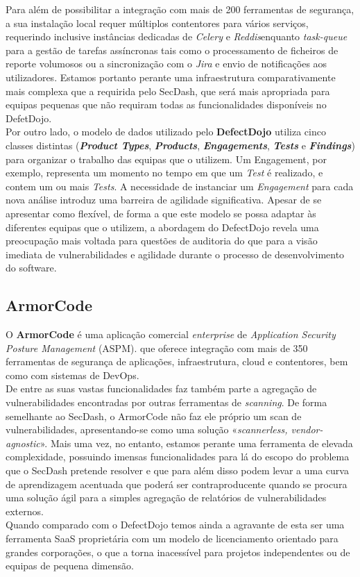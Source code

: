 Para além de possibilitar a integração com mais de 200 ferramentas de segurança, a sua instalação local requer múltiplos contentores para vários serviços, requerindo inclusive instâncias dedicadas de \textit{Celery} e \textit{Reddis}enquanto \textit{task-queue} para a gestão de tarefas assíncronas tais como o processamento de ficheiros de reporte volumosos ou a sincronização com o \textit{Jira} e envio de notificações aos utilizadores. Estamos portanto perante uma infraestrutura comparativamente mais complexa que a requirida pelo SecDash, que será mais apropriada para equipas pequenas que não requiram todas as funcionalidades disponíveis no DefetDojo.\\

Por outro lado, o modelo de dados utilizado pelo \textbf{DefectDojo} utiliza cinco classes distintas (\textbf{\textit{Product Types}}, \textbf{\textit{Products}}, \textbf{\textit{Engagements}}, \textbf{\textit{Tests}} e \textbf{\textit{Findings}}) para organizar o trabalho das equipas que o utilizem.\cite{modeldefectdojo} Um Engagement, por exemplo, representa um momento no tempo em que um \textit{Test} é realizado, e contem um ou mais \textit{Tests}. A necessidade de instanciar um \textit{Engagement} para cada nova análise introduz uma barreira de agilidade significativa. Apesar de se apresentar como flexível, de forma a que este modelo se possa adaptar às diferentes equipas que o utilizem, a abordagem do DefectDojo revela uma preocupação mais voltada para questões de auditoria do que para a visão imediata de vulnerabilidades e agilidade durante o processo de desenvolvimento do software.\\

\subsection{ArmorCode}
O \textbf{ArmorCode} é uma aplicação comercial \textit{enterprise} de \textit{Application Security Posture Management} (ASPM). que oferece integração com mais de 350 ferramentas de segurança de aplicações, infraestrutura, cloud e contentores, bem como com sistemas de DevOps. \\

De entre as suas vastas funcionalidades faz também parte a agregação de vulnerabilidades encontradas por outras ferramentas de \textit{scanning}. De forma semelhante ao SecDash, o ArmorCode não faz ele próprio um scan de vulnerabilidades, apresentando-se como uma solução «\textit{scannerless, vendor-agnostic}»\cite{scanerless}. Mais uma vez, no entanto, estamos perante uma ferramenta de elevada complexidade, possuindo imensas funcionalidades para lá do escopo do problema que o SecDash pretende resolver e que para além disso podem levar a uma curva de aprendizagem acentuada que poderá ser contraproducente quando se procura uma solução ágil para a simples agregação de relatórios de vulnerabilidades externos. \\

Quando comparado com o DefectDojo temos ainda a agravante de esta ser uma ferramenta SaaS proprietária com um modelo de licenciamento orientado para grandes corporações, o que a torna inacessível para projetos independentes ou de equipas de pequena dimensão. \\
